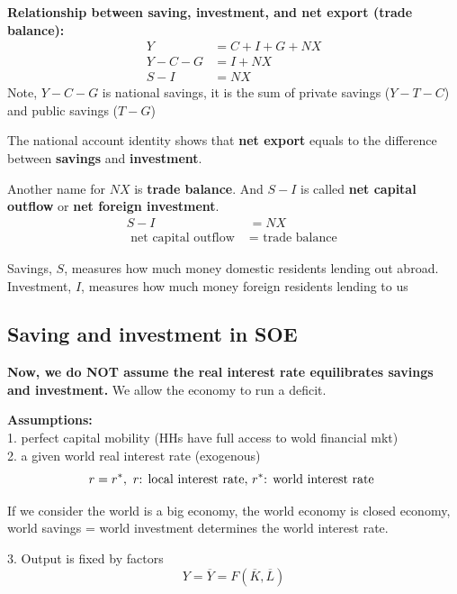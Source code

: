 \documentclass[12pt]{article}
\begin{document}
{\textbf {Relationship between saving, investment, and net export (trade balance):}}
\begin{align*}
Y &= C + I + G + NX\\
Y - C - G &= I + NX\\
S - I &= NX
\end{align*}
Note, $ Y - C - G $ is national savings, it is the sum of private savings ($ Y - T - C
$) and public savings ($ T - G $)

The national account identity shows that {\textbf {net export}} equals to the
difference between {\textbf {savings}} and {\textbf {investment}}.

Another name for $ NX $ is {\textbf {trade balance}}. And $ S - I $ is called
{\textbf {net capital outflow}} or {\textbf {net foreign investment}}.
\begin{align*}
S - I &= NX\\
\text{ net capital outflow } &= \text{ trade balance }
\end{align*}

Savings, $ S $, measures how much money domestic residents lending out abroad.
Investment, $ I $, measures how much money foreign residents lending to us




\subsection{Saving and investment in SOE}
{\textbf {Now, we do NOT assume the real interest rate equilibrates savings and 
investment.}} We allow the economy to run a deficit.

{\textbf {Assumptions:}}\\
1. perfect capital mobility (HHs have full access to wold financial mkt)\\
2. a given world real interest rate (exogenous)
\begin{equation*}
r = r^{*}, \text{ $ r $: local interest rate, $ r^{*} $: world interest rate }
\end{equation*}

If we consider the world is a big economy, the world economy is  closed economy,
world savings = world investment determines the world interest rate.




3. Output is fixed by factors
\begin{equation*}
Y =  \overline{Y} = F( \overline{K},  \overline{L})
\end{equation*}
\end{document}
